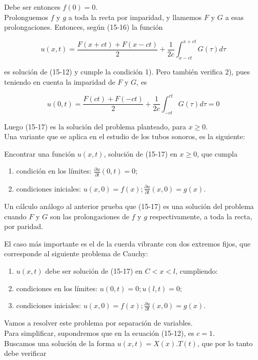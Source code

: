 \documentclass[10pt]{article}
\theoremstyle{plain}
\theoremstyle{definition}
\theoremstyle{remark}
\begin{document}
Debe ser entonces $f(0)=0$.\\
Prolonguemos $f$ y $g$ a toda la recta por imparidad, y llamemos $F$ y $G$ a esas prolongaciones. Entonces, según (15-16) la función


\begin{equation*}
u(x, t)=\frac{F(x+c t)+F(x-c t)}{2}+\frac{1}{2 c} \int_{x-c t}^{x+c t} G(\tau) d \tau \tag{15-17}
\end{equation*}


es solución de (15-12) y cumple la condición 1). Pero también verifica 2), pues teniendo en cuenta la imparidad de $F$ y $G$, es

$$
u(0, t)=\frac{F(c t)+F(-c t)}{2}+\frac{1}{2 c} \int_{-c t}^{c t} G(\tau) d \tau=0
$$

Luego (15-17) es la solución del problema planteado, para $x \geqslant 0$.\\
Una variante que se aplica en el estudio de los tubos sonoros, es la siguiente:

Encontrar una función $u(x, t)$, solución de (15-17) en $x \geqslant 0$, que cumpla


\begin{enumerate}
  \item condición en los límites: $\frac{\partial u}{\partial t}(0, t)=0$;
  \item condiciones iniciales: $u(x, 0)=f(x) ; \frac{\partial u}{\partial t}(x, 0)=g(x)$.
\end{enumerate}

Un cálculo análogo al anterior prueba que (15-17) es una solución del problema cuando $F$ y $G$ son las prolongaciones de $f$ y $g$ respectivamente, a toda la recta, por paridad.

El caso más importante es el de la cuerda vibrante con dos extremos fijos, que corresponde al siguiente problema de Cauchy:

\begin{enumerate}
  \item $u(x, t)$ debe ser solución de (15-17) en $C<x<l$, cumpliendo:
  \item condiciones en los límites: $u(0, t)=0 ; u(l, t)=0$;
  \item condiciones iniciales: $u(x, 0)=f(x) ; \frac{\partial u}{\partial t}(x, 0)=g(x)$.
\end{enumerate}

Vamos a resolver este problema por separación de variables.\\
Para simplificar, supondremos que en la ecuación (15-12), es $c=1$.\\
Buscamos una solución de la forma $u(x, t)=X(x) . T(t)$, que por lo tanto debe verificar
\end{document}
